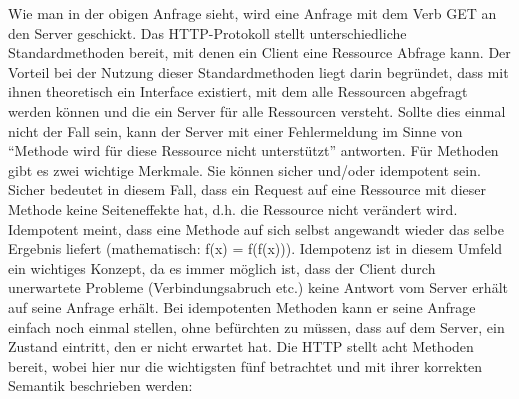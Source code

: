 Wie man in der obigen Anfrage sieht, wird eine Anfrage mit dem Verb GET an den Server geschickt. Das HTTP-Protokoll stellt unterschiedliche Standardmethoden bereit, mit denen ein Client eine Ressource Abfrage kann. Der Vorteil bei der Nutzung dieser Standardmethoden liegt darin begründet, dass mit ihnen theoretisch ein Interface existiert, mit dem alle Ressourcen abgefragt werden können und die ein Server für alle Ressourcen versteht. Sollte dies einmal nicht der Fall sein, kann der Server mit einer Fehlermeldung im Sinne von "`Methode wird für diese Ressource nicht unterstützt"' antworten. Für Methoden gibt es zwei wichtige Merkmale. Sie können sicher und/oder idempotent sein. Sicher bedeutet in diesem Fall, dass ein Request auf eine Ressource mit dieser Methode keine Seiteneffekte hat, d.h. die Ressource nicht verändert wird. Idempotent meint, dass eine Methode auf sich selbst angewandt wieder das selbe Ergebnis liefert (mathematisch: f(x) = f(f(x))). Idempotenz ist in diesem Umfeld ein wichtiges Konzept, da es immer möglich ist, dass der Client durch unerwartete Probleme (Verbindungsabruch etc.) keine Antwort vom Server erhält auf seine Anfrage erhält. Bei idempotenten Methoden kann er seine Anfrage einfach noch einmal stellen, ohne befürchten zu müssen, dass auf dem Server, ein Zustand eintritt, den er nicht erwartet hat. Die HTTP stellt acht Methoden bereit, wobei hier nur die wichtigsten fünf betrachtet und mit ihrer korrekten Semantik beschrieben werden:
